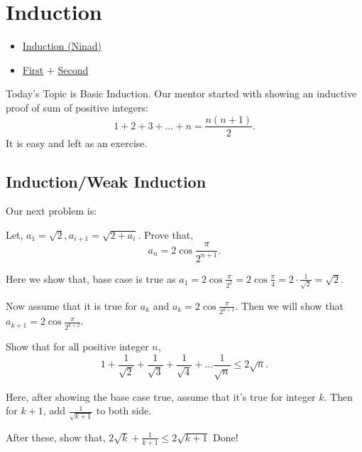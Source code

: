 \chapter{Induction}%

\begin{linkb}
   \begin{itemize}
        \item \href{https://www.youtube.com/watch?v=C-0pRTD4H0w}{Induction (Ninad)} 
        \item \href{https://drive.google.com/file/d/1Z1h4jfZvrb69Jrayc0IMmopX9yzz9Z_L/view?usp=sharing}{First} \(+\) \href{https://drive.google.com/file/d/12zWftwXBXeYKMCBMGh-cPhG69r0zoc99/view}{Second}
   \end{itemize}
\end{linkb}

Today's Topic is Basic Induction. Our mentor started with showing an inductive proof of sum of positive integers:
\[ 1 + 2 +3+ \ldots + n = \frac{n(n+1)}{2} .\]
It is easy and left as an exercise.

\section{Induction/Weak Induction}
Our next problem is:

\begin{example}
Let, \(a_1=\sqrt{2}, a_{i+1}=\sqrt{2+a_i}\). Prove that, \[ a_n = 2\cos \frac{\pi}{2^{n+1}}. \]
\end{example}

\begin{soln}
Here we show that, base case is true as \(a_1=2\cos \frac{\pi}{2^2} = 2\cos \frac{\pi}{4} =2 \cdot \frac{1}{\sqrt 2} = \sqrt{2} \).

Now assume that it is true for \(a_k\) and \(a_k=2\cos \frac{\pi}{2^{k+1}}\). Then we will show that \(a_{k+1} = 2\cos \frac{\pi}{2^{k+2}}\).

\end{soln} 


\begin{example}
Show that for all positive integer \(n\), \[ 1+ \frac{1}{\sqrt{2}}+ \frac{1}{\sqrt{3}}+ \frac{1}{\sqrt{4}}+ \ldots \frac{1}{\sqrt{n}} \le 2\sqrt{n}. \]
\end{example}

\begin{soln}
Here, after showing the base case true, assume that it's true for integer $k$. Then for $k+1$, add $\frac{1}{\sqrt{k+1}}$ to both side.

After these, show that, $2\sqrt{k} + \frac{1}{k+1} \le 2\sqrt{k+1}$
Done!
\end{soln}

